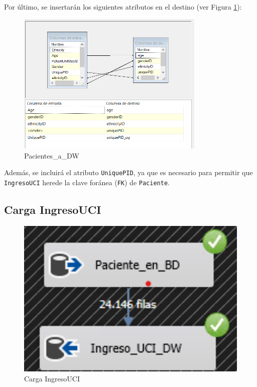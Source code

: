 \documentclass[12pt, a4paper, twoside]{article}
\begin{document}
	
	Por último, se insertarán los siguientes atributos en el destino (ver Figura \ref{fig:27}):
	
	\begin{figure}[H]
		\centering
		\includegraphics[width=0.8\textwidth]{image/108_carga_paciente_destino.png}
		\caption{Pacientes\_a\_DW}
		\label{fig:27}
	\end{figure}

	
	Además, se incluirá el atributo \texttt{UniquePID}, ya que es necesario para permitir que \texttt{IngresoUCI} herede la clave foránea (\texttt{FK}) de \texttt{Paciente}.
	
	\subsection{Carga IngresoUCI}
	
	\begin{figure}[H]
		\centering
		\includegraphics[width=1\textwidth]{image/110_carga_ingreso.png}
		\caption{Carga IngresoUCI}
		\label{fig:19}
	\end{figure}
	
\end{document}
